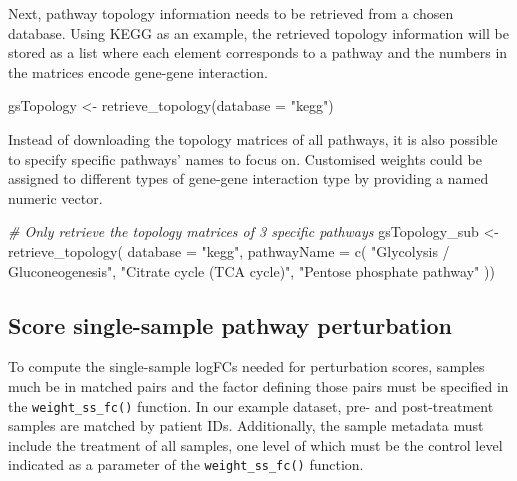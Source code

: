 \documentclass[9pt,a4paper,]{extarticle}
\newenvironment{Shaded}{\begin{snugshade}}{\end{snugshade}}
\newcommand{\AttributeTok}[1]{\textcolor[rgb]{0.77,0.63,0.00}{#1}}
\newcommand{\CommentTok}[1]{\textcolor[rgb]{0.56,0.35,0.01}{\textit{#1}}}
\newcommand{\FunctionTok}[1]{\textcolor[rgb]{0.00,0.00,0.00}{#1}}
\newcommand{\NormalTok}[1]{#1}
\newcommand{\OtherTok}[1]{\textcolor[rgb]{0.56,0.35,0.01}{#1}}
\newcommand{\StringTok}[1]{\textcolor[rgb]{0.31,0.60,0.02}{#1}}
\begin{document}
Next, pathway topology information needs to be retrieved from a chosen database. Using KEGG as an example, the retrieved topology information will be stored as a list where each element corresponds to a pathway and the numbers in the matrices encode gene-gene interaction.

\begin{Shaded}
\begin{Highlighting}[]
\NormalTok{gsTopology }\OtherTok{\textless{}{-}} \FunctionTok{retrieve\_topology}\NormalTok{(}\AttributeTok{database =} \StringTok{"kegg"}\NormalTok{)}
\end{Highlighting}
\end{Shaded}

Instead of downloading the topology matrices of all pathways, it is also possible to specify specific pathways' names to focus on. Customised weights could be assigned to different types of gene-gene interaction type by providing a named numeric vector.

\begin{Shaded}
\begin{Highlighting}[]
\CommentTok{\# Only retrieve the topology matrices of 3 specific pathways}
\NormalTok{gsTopology\_sub }\OtherTok{\textless{}{-}} \FunctionTok{retrieve\_topology}\NormalTok{(}
  \AttributeTok{database =} \StringTok{"kegg"}\NormalTok{,}
  \AttributeTok{pathwayName =} \FunctionTok{c}\NormalTok{(}
    \StringTok{"Glycolysis / Gluconeogenesis"}\NormalTok{, }
    \StringTok{"Citrate cycle (TCA cycle)"}\NormalTok{,}
    \StringTok{"Pentose phosphate pathway"}
\NormalTok{))}
\end{Highlighting}
\end{Shaded}

\hypertarget{score-single-sample-pathway-perturbation}{%
\subsection{Score single-sample pathway perturbation}\label{score-single-sample-pathway-perturbation}}

To compute the single-sample logFCs needed for perturbation scores, samples much be in matched pairs and the factor defining those pairs must be specified in the \texttt{weight\_ss\_fc()} function. In our example dataset, pre- and post-treatment samples are matched by patient IDs. Additionally, the sample metadata must include the treatment of all samples, one level of which must be the control level indicated as a parameter of the \texttt{weight\_ss\_fc()} function.
\end{document}
